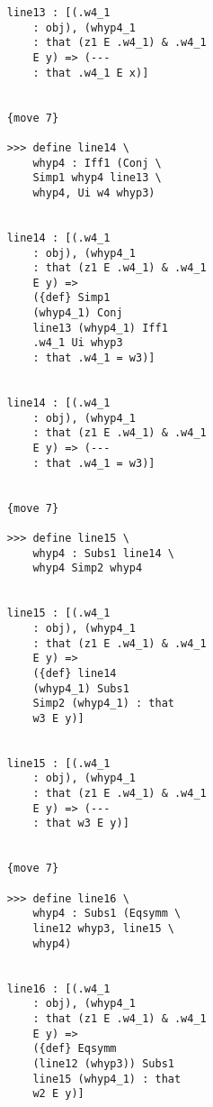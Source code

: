 \documentclass[12pt]{article}
\begin{document}
\begin{verbatim}
                        line13 : [(.w4_1 
                            : obj), (whyp4_1 
                            : that (z1 E .w4_1) & .w4_1 
                            E y) => (--- 
                            : that .w4_1 E x)]


                        {move 7}

                        >>> define line14 \
                            whyp4 : Iff1 (Conj \
                            Simp1 whyp4 line13 \
                            whyp4, Ui w4 whyp3)


                        line14 : [(.w4_1 
                            : obj), (whyp4_1 
                            : that (z1 E .w4_1) & .w4_1 
                            E y) => 
                            ({def} Simp1 
                            (whyp4_1) Conj 
                            line13 (whyp4_1) Iff1 
                            .w4_1 Ui whyp3 
                            : that .w4_1 = w3)]


                        line14 : [(.w4_1 
                            : obj), (whyp4_1 
                            : that (z1 E .w4_1) & .w4_1 
                            E y) => (--- 
                            : that .w4_1 = w3)]


                        {move 7}

                        >>> define line15 \
                            whyp4 : Subs1 line14 \
                            whyp4 Simp2 whyp4


                        line15 : [(.w4_1 
                            : obj), (whyp4_1 
                            : that (z1 E .w4_1) & .w4_1 
                            E y) => 
                            ({def} line14 
                            (whyp4_1) Subs1 
                            Simp2 (whyp4_1) : that 
                            w3 E y)]


                        line15 : [(.w4_1 
                            : obj), (whyp4_1 
                            : that (z1 E .w4_1) & .w4_1 
                            E y) => (--- 
                            : that w3 E y)]


                        {move 7}

                        >>> define line16 \
                            whyp4 : Subs1 (Eqsymm \
                            line12 whyp3, line15 \
                            whyp4)


                        line16 : [(.w4_1 
                            : obj), (whyp4_1 
                            : that (z1 E .w4_1) & .w4_1 
                            E y) => 
                            ({def} Eqsymm 
                            (line12 (whyp3)) Subs1 
                            line15 (whyp4_1) : that 
                            w2 E y)]



\end{verbatim}
\end{document}
